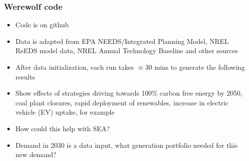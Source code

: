 \documentclass[xcolor=dvipsnames]{beamer}
\newcommand{\exclude}[1]{}
\begin{document}
\begin{frame}
  \frametitle{Werewolf code}

  \begin{itemize}
  \item Code is on github
  \item Data is adapted from EPA NEEDS/Integrated Planning Model, NREL
    ReEDS model data, NREL Annual Technology Baseline and other
    sources
    \color{blue}
  \item After data initialization, each run takes $\approx 30$ mins to generate
    the following results
  \item Show effects of strategies driving towards 100\% carbon free
    energy by 2050, coal plant closures, rapid deployment of
    renewables, increase in electric vehicle (EV) uptake, for example
  \item How could this help with SEA?
  \item \alert{Demand in 2030 is a data input, what generation portfolio
    needed for this new demand?}
  \end{itemize}

\end{frame}

\exclude{
Thanks for getting all this up and running.   I have reviewed the slides below (pdf and tex attached) and am commenting only on slides 7 - 12.   I think it would be useful to generate some (modified) stories using your new system like:

1) Carbon reductions (with flat imports):   comparison between with and without plant shutdowns  (slide 7 and 9 bottom row).
   I would replace the first figure of the three in each line by some kind of cost figure.

   I also like the slides detailing the spatial distribution of the up or down take.

2) From slide 11, it would be good to do an EV increase in demand.   Maybe some visualization of how that changes demand, and then some figures to tell a story.

3) Rapid deployment of wind and solar resources.   Force the model to do more solar and wind (I don’t really know how much) and find out what gets shut down, operated differently.    I don’t know where the solar or wind should be deployed (maybe this would still be up to the model), but forcing a (percentage?) increase in the amounts of these by 2030 of different amounts would be interesting to see what happens to the other things….

4) Shut down of non-renewable capacity (as opposed to carbon reduction) a la slide 12.   Some idea of how this affects things would be good.

For the appendix, I am wondering if we could do a better job on the data (slide 6).   It might be nice to understand more fully what we have available or how we do the transformations.
}
\end{document}
